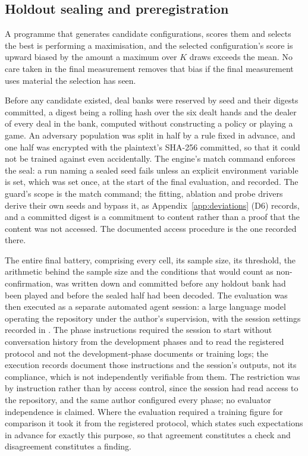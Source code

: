 \subsection{Holdout sealing and preregistration}
\label{sec:evaluation-seal}

A programme that generates candidate configurations, scores them and selects the best is performing a
maximisation, and the selected configuration's score is upward biased by the amount a maximum over
$K$ draws exceeds the mean. No care taken in the final measurement removes that bias if the final
measurement uses material the selection has seen.

Before any candidate existed, deal banks were reserved by seed and their digests committed, a digest
being a rolling hash over the six dealt hands and the dealer of every deal in the bank, computed
without constructing a policy or playing a game. An adversary population was split in half by a rule
fixed in advance, and one half was encrypted with the plaintext's SHA-256 committed, so that it could
not be trained against even accidentally. The engine's match command enforces the seal: a run
naming a sealed seed fails unless an explicit environment variable is set, which was set once, at
the start of the final evaluation, and recorded. The guard's scope is the match command; the
fitting, ablation and probe drivers derive their own seeds and bypass it, as Appendix~\ref{app:deviations}
(D6) records, and a committed digest is a commitment to content rather than a proof that the content
was not accessed. The documented access procedure is the one recorded there.

The entire final battery, comprising every cell, its sample size, its threshold, the arithmetic
behind the sample size and the conditions that would count as non-confirmation, was written down and
committed before any holdout bank had been played and before the sealed half had been decoded. The
evaluation was then executed as a separate automated agent session: a large language model
operating the repository under the author's supervision, with the session settings recorded in
. The phase instructions required the session to start
without conversation history from the development phases and to read the registered protocol and
not the development-phase documents or training logs; the execution records document those
instructions and the session's outputs, not its compliance, which is not independently verifiable
from them. The restriction was by instruction rather than by access control, since the session had
read access to the repository, and the same author configured every phase; no evaluator
independence is claimed. Where the evaluation required a training figure for comparison it took it
from the registered protocol, which states such expectations in advance for exactly this purpose, so that agreement
constitutes a check and disagreement constitutes a finding.

